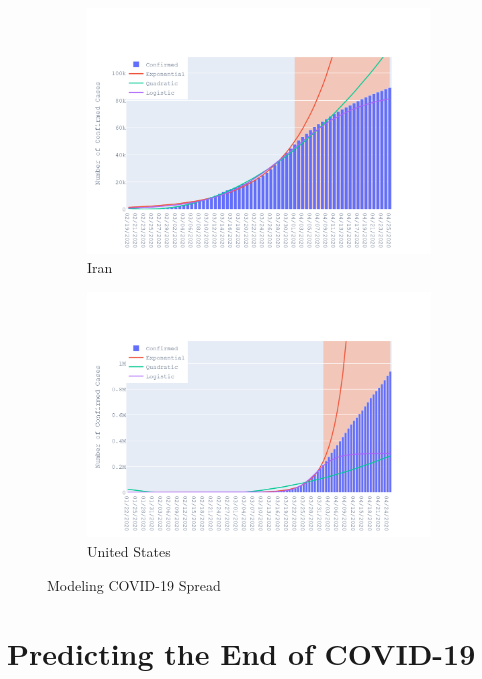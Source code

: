 \documentclass{homework}
\begin{document}
\begin{figure}[H]
  \begin{subfigure}{0.45\linewidth}
    \includegraphics[width=\linewidth]{task1/Iran.png}
    \caption{Iran}
  \end{subfigure}
  \hfil
  \begin{subfigure}{0.45\linewidth}
    \includegraphics[width=\linewidth]{task1/United States.png}
    \caption{United States}
  \end{subfigure}

  \caption{Modeling COVID-19 Spread}
  \label{fig:task1}
\end{figure}

\newpage
\section{Predicting the End of COVID-19}
\end{document}
